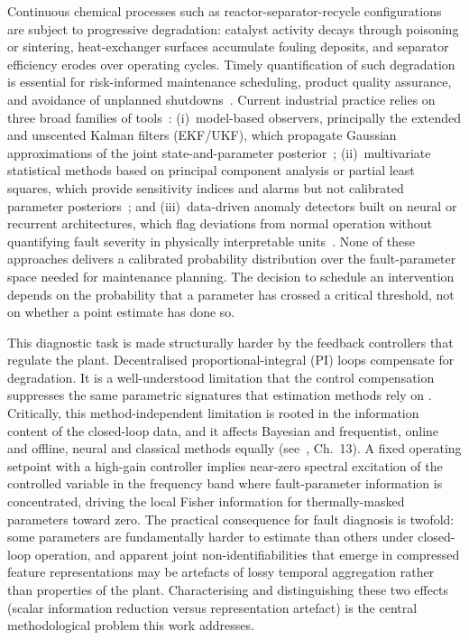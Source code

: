 \documentclass[aps,pre,twocolumn,superscriptaddress]{revtex4-2}
\begin{document}
Continuous chemical processes such as reactor-separator-recycle configurations
are subject to progressive degradation: catalyst activity decays through
poisoning or sintering, heat-exchanger surfaces accumulate fouling deposits,
and separator efficiency erodes over operating cycles.  
Timely quantification
of such degradation is essential for risk-informed maintenance scheduling,
product quality assurance, and avoidance of unplanned shutdowns~\citep{Frank1990,Isermann2006}.
Current industrial practice relies on three broad families of tools~\citep{ZHAO2026112159, Huo2026}:
(i)~model-based observers, principally the extended and unscented Kalman filters
(EKF/UKF), which propagate Gaussian approximations of the joint state-and-parameter
posterior~\citep{Jazwinski1970,JulierUhlmann2004};
(ii)~multivariate statistical methods based on principal component analysis or
partial least squares, which provide sensitivity indices and alarms but not
calibrated parameter posteriors~\citep{Qin2012, Kini2024, Lou2021, Huo2026}; and
(iii)~data-driven anomaly detectors built on neural or recurrent architectures,
which flag deviations from normal operation without quantifying fault severity in
physically interpretable units~\citep{WU2018185, Jia2025, Feng2026, HAN2020161, HAN20258859}.
None of these approaches delivers a calibrated
probability distribution over the fault-parameter space needed for maintenance planning. The decision to schedule an
intervention depends on the probability that a parameter has crossed a critical
threshold, not on whether a point estimate has done so.

This diagnostic task is made structurally harder by the feedback controllers
that regulate the plant. Decentralised proportional-integral (PI) loops
compensate for degradation.
It is a well-understood limitation that the control compensation suppresses the same parametric
signatures that estimation methods rely on \citep{Gustavsson1977, Forssell1999}. Critically, this method-independent limitation is rooted in the information content of the closed-loop data, and it affects Bayesian and frequentist, online and offline, neural and classical methods equally (see~\citealt{Ljung1999}, Ch.~13). A fixed operating setpoint with a high-gain
controller implies near-zero spectral excitation of the controlled variable in the frequency band where fault-parameter information is concentrated, driving the local Fisher information for thermally-masked parameters toward zero. The practical consequence for fault diagnosis is twofold: some parameters are fundamentally harder to estimate than others under closed-loop operation, and apparent joint non-identifiabilities that emerge in compressed feature representations may be artefacts of lossy temporal aggregation rather than properties of the plant.  Characterising and distinguishing these two effects (scalar information reduction versus representation artefact) is the central methodological problem this work addresses.
\end{document}
